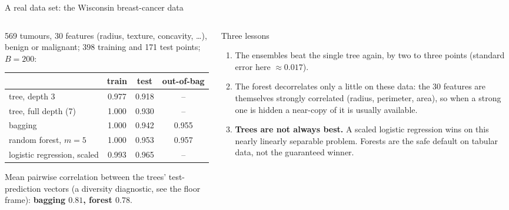 \documentclass[10pt,aspectratio=169]{beamer}
\begin{document}
\begin{frame}{A real data set: the Wisconsin breast-cancer data}
\small
\begin{columns}[T]
\begin{column}{0.52\textwidth}
569 tumours, 30 features (radius, texture, concavity, \dots), benign or
malignant; 398 training and 171 test points; $B=200$:
\begin{center}
\setlength{\tabcolsep}{3.5pt}
\begin{tabular}{lccc}\toprule
 & train & test & out-of-bag\\\midrule
tree, depth 3 & 0.977 & 0.918 & --\\
tree, full depth (7) & 1.000 & 0.930 & --\\
bagging & 1.000 & 0.942 & 0.955\\
random forest, $m=5$ & 1.000 & 0.953 & 0.957\\
logistic regression, scaled & 0.993 & 0.965 & --\\\bottomrule
\end{tabular}
\end{center}
Mean pairwise correlation between the trees' test-prediction vectors (a
diversity diagnostic, see the floor frame):
\textbf{bagging $0.81$, forest $0.78$}.
\end{column}
\begin{column}{0.46\textwidth}
\footnotesize
\begin{block}{Three lessons}
\begin{enumerate}
  \item The ensembles beat the single tree again, by two to three points
        (standard error here $\approx 0.017$).
  \item The forest decorrelates only a little on these data: the 30 features
        are themselves strongly correlated (radius, perimeter, area), so
        when a strong one is hidden a near-copy of it is usually available.
  \item \textbf{Trees are not always best.}  A scaled logistic regression
        wins on this nearly linearly separable problem.  Forests are the
        safe default on tabular data, not the guaranteed winner.
\end{enumerate}
\end{block}
\end{column}
\end{columns}
\end{frame}
\end{document}
